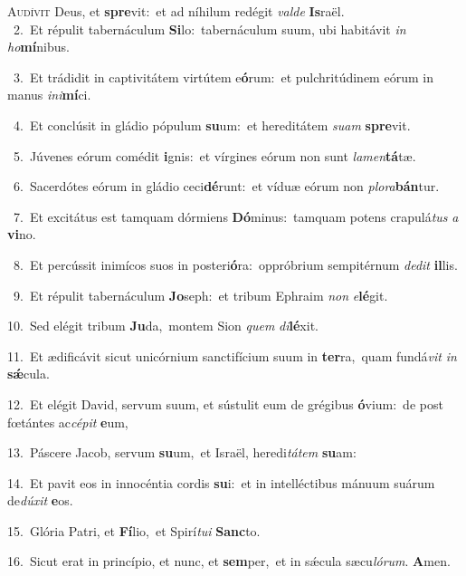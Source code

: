 \lettrine{\initial\textcolor{\initialcolor}{A}}{udívit} Deus, et \textbf{spre}\-vit:~\star et ad níhilum redégit \textit{val}\-\textit{de} \textbf{Is}\-raël.\\
{\numbfont\textcolor{\numbcolor}{~2.}}~Et répulit tabernáculum \textbf{Si}\-lo:~\star tabernáculum suum, ubi habitávit \textit{in} \textit{ho}\-\textbf{mí}nibus.\par
{\numbfont\textcolor{\numbcolor}{~3.}}~Et trádidit in captivitátem virtútem e\-\textbf{ó}\-rum:~\star et pulchritúdinem eórum in manus \textit{in}\-\textit{i}\textbf{mí}ci.\par
{\numbfont\textcolor{\numbcolor}{~4.}}~Et conclúsit in gládio pópulum \textbf{su}\-um:~\star et hereditátem \textit{su}\-\textit{am} \textbf{spre}\-vit.\par
{\numbfont\textcolor{\numbcolor}{~5.}}~Júvenes eórum comédit \textbf{i}\-gnis:~\star et vírgines eórum non sunt \textit{la}\-\textit{men}\textbf{tá}tæ.\par
{\numbfont\textcolor{\numbcolor}{~6.}}~Sacerdótes eórum in gládio ceci\-\textbf{dé}\-runt:~\star et víduæ eórum non \textit{plo}\-\textit{ra}\textbf{bán}tur.\par
{\numbfont\textcolor{\numbcolor}{~7.}}~Et excitátus est tamquam dórmiens \textbf{Dó}\-minus:~\star tamquam potens crapulá\textit{tus} \textit{a} \textbf{vi}\-no.\par
{\numbfont\textcolor{\numbcolor}{~8.}}~Et percússit inimícos suos in posteri\-\textbf{ó}\-ra:~\star oppróbrium sempitérnum \textit{de}\-\textit{dit} \textbf{il}\-lis.\par
{\numbfont\textcolor{\numbcolor}{~9.}}~Et répulit tabernáculum \textbf{Jo}\-seph:~\star et tribum Ephraim \textit{non} \textit{e}\-\textbf{lé}git.\par
{\numbfont\textcolor{\numbcolor}{10.}}~Sed elégit tribum \textbf{Ju}\-da,~\star montem Sion \textit{quem} \textit{di}\-\textbf{lé}xit.\par
{\numbfont\textcolor{\numbcolor}{11.}}~Et ædificávit sicut unicórnium sanctifícium suum in \textbf{ter}\-ra,~\star quam fundá\textit{vit} \textit{in} \textbf{sǽ}\-cula.\par
{\numbfont\textcolor{\numbcolor}{12.}}~Et elégit David, servum suum, et sústulit eum de grégibus \textbf{ó}\-vium:~\star de post fœtántes ac\-\textit{cé}\-\textit{pit} \textbf{e}\-um,\par
{\numbfont\textcolor{\numbcolor}{13.}}~Páscere Jacob, servum \textbf{su}\-um,~\star et Israël, heredi\-\textit{tá}\-\textit{tem} \textbf{su}\-am:\par
{\numbfont\textcolor{\numbcolor}{14.}}~Et pavit eos in innocéntia cordis \textbf{su}\-i:~\star et in intelléctibus mánuum suárum de\-\textit{dú}\-\textit{xit} \textbf{e}\-os.\par
{\numbfont\textcolor{\numbcolor}{15.}}~Glória Patri, et \textbf{Fí}\-lio,~\star et Spirí\-\textit{tu}\-\textit{i} \textbf{Sanc}\-to.\par
{\numbfont\textcolor{\numbcolor}{16.}}~Sicut erat in princípio, et nunc, et \textbf{sem}\-per,~\star et in sǽcula sæcu\-\textit{ló}\-\textit{rum}. \textbf{A}\-men.\par
